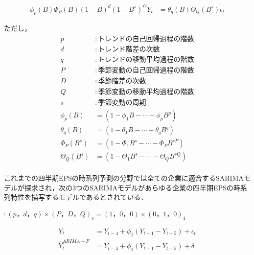 \documentclass[a4paper，11pt]{jsarticle}
\begin{document}
\begin{equation}
  \begin{split}
    \phi_p(B)\Phi_{P}(B)(1-B)^d(1-B^s)^DY_t &= \theta_q(B)\Theta_Q(B^s)\epsilon_t
  \end{split}
\end{equation}

ただし，
\begin{equation}
  \begin{split}
    p &: トレンドの自己回帰過程の階数 \\
    d &: トレンド階差の次数 \\
    q &: トレンドの移動平均過程の階数 \\
    P &: 季節変動の自己回帰過程の階数 \\
    D &: 季節階差の次数 \\
    Q &: 季節変動の移動平均過程の階数 \\
    s &: 季節変動の周期 \\
    \phi_p(B) &= (1 - \phi_1B - \cdots - \phi_pB^p) \\
    \theta_q(B) &= (1 - \theta_1B - \cdots - \theta_qB^q) \\
    \Phi_P(B^s) &= (1 - \Phi_1B^s - \cdots - \Phi_PB^{sP}) \\
    \Theta_Q(B^s) &= (1 - \Theta_1B^s - \cdots - \Theta_QB^{sQ}) \\
  \end{split}
\end{equation}

これまでの四半期EPSの時系列予測の分野では全ての企業に適合するSARIMAモデルが探求され，次の3つのSARIMAモデル\citep*{foster1977quarterly, griffin1977time, brown1979univariate}があらゆる企業の四半期EPSの時系列特性を描写するモデルであるとされている．

\cite{foster1977quarterly} $: (p，d，q) \times (P，D，Q)_s = (1，0，0) \times (0，1，0)_4$

\begin{equation}
  \begin{split}
    Y_t &= Y_{t-4} + \phi_1(Y_{t-1} - Y_{t-5}) + \epsilon_t \\
    \hat{Y}_t^{ARIMA-F} &= Y_{t-4} + \phi_1(Y_{t-1} - Y_{t-5}) + \delta \\
  \end{split}
\end{equation}
\end{document}
